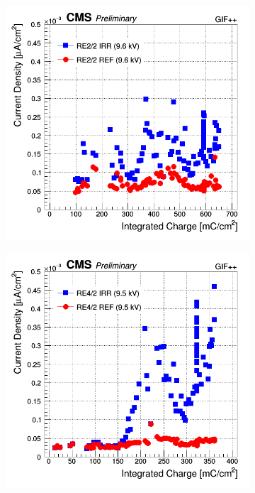 	\begin{figure}[H]
    	\begin{subfigure}{0.5\linewidth}
    		\centering
			\includegraphics[width = \linewidth]{fig/chapt5/RE2-2-Dark-Current-vs-Time-9600.png}
        	\caption{\label{fig:GIFpp-Dark-rate-mon:A}}
    	\end{subfigure}
    	\begin{subfigure}{0.5\linewidth}
			\centering
    		\includegraphics[width = \linewidth]{fig/chapt5/RE4-2-Dark-Current-vs-Time-9500.png}

\end{subfigure}
\end{figure}
